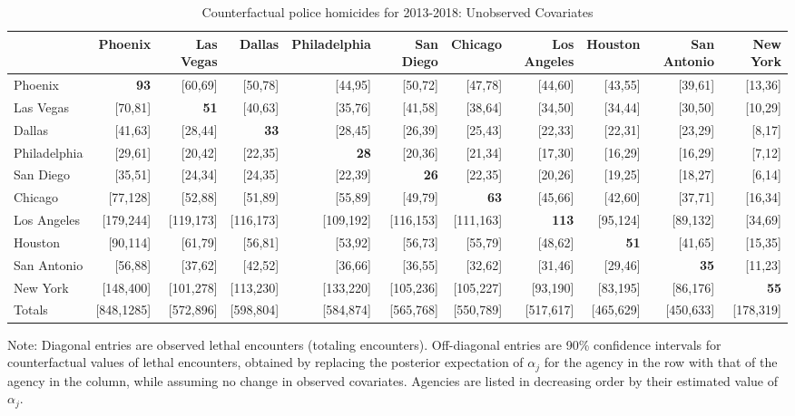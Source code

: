 \begin{table}[h!]\centering\scriptsize\tabcolsep=0.1cm\caption{Counterfactual police homicides for 2013-2018: Unobserved Covariates} \label{table:bootstrap_counterfactual_unobs}\begin{tabular}{lrrrrrrrrrr}\hline \hline&Phoenix&Las Vegas&Dallas&Philadelphia&San Diego&Chicago&Los Angeles&Houston&San Antonio&New York\\
\hline
Phoenix&\textbf{93}&[60,69]&[50,78]&[44,95]&[50,72]&[47,78]&[44,60]&[43,55]&[39,61]&[13,36]\\
Las Vegas&[70,81]&\textbf{51}&[40,63]&[35,76]&[41,58]&[38,64]&[34,50]&[34,44]&[30,50]&[10,29]\\
Dallas&[41,63]&[28,44]&\textbf{33}&[28,45]&[26,39]&[25,43]&[22,33]&[22,31]&[23,29]&[8,17]\\
Philadelphia&[29,61]&[20,42]&[22,35]&\textbf{28}&[20,36]&[21,34]&[17,30]&[16,29]&[16,29]&[7,12]\\
San Diego&[35,51]&[24,34]&[24,35]&[22,39]&\textbf{26}&[22,35]&[20,26]&[19,25]&[18,27]&[6,14]\\
Chicago&[77,128]&[52,88]&[51,89]&[55,89]&[49,79]&\textbf{63}&[45,66]&[42,60]&[37,71]&[16,34]\\
Los Angeles&[179,244]&[119,173]&[116,173]&[109,192]&[116,153]&[111,163]&\textbf{113}&[95,124]&[89,132]&[34,69]\\
Houston&[90,114]&[61,79]&[56,81]&[53,92]&[56,73]&[55,79]&[48,62]&\textbf{51}&[41,65]&[15,35]\\
San Antonio&[56,88]&[37,62]&[42,52]&[36,66]&[36,55]&[32,62]&[31,46]&[29,46]&\textbf{35}&[11,23]\\
New York&[148,400]&[101,278]&[113,230]&[133,220]&[105,236]&[105,227]&[93,190]&[83,195]&[86,176]&\textbf{55}\\
\hline
Totals&[848,1285]&[572,896]&[598,804]&[584,874]&[565,768]&[550,789]&[517,617]&[465,629]&[450,633]&[178,319]\\
\hline\end{tabular}\begin{center}\begin{minipage}{1.05\textwidth} %
 {\footnotesize {\schape Note}: Diagonal entries are observed lethal encounters (totaling \totalincidentsten{} encounters). Off-diagonal entries are 90\% confidence intervals for counterfactual values of lethal encounters, obtained by replacing the posterior expectation of $\alpha_j$ for the agency in the row with that of the agency in the column, while assuming no change in observed covariates. Agencies are listed in decreasing order by their estimated value of $\alpha_j$.} 
 \end{minipage} 
 \end{center} 
 \end{table} 

